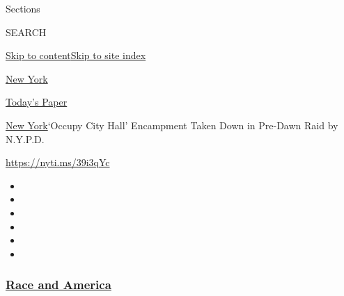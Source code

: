 Sections

SEARCH

\protect\hyperlink{site-content}{Skip to
content}\protect\hyperlink{site-index}{Skip to site index}

\href{https://www.nytimes3xbfgragh.onion/section/nyregion}{New York}

\href{https://myaccount.nytimes3xbfgragh.onion/auth/login?response_type=cookie\&client_id=vi}{}

\href{https://www.nytimes3xbfgragh.onion/section/todayspaper}{Today's
Paper}

\href{/section/nyregion}{New York}\textbar{}`Occupy City Hall'
Encampment Taken Down in Pre-Dawn Raid by N.Y.P.D.

\url{https://nyti.ms/39i3qYc}

\begin{itemize}
\item
\item
\item
\item
\item
\item
\end{itemize}

\hypertarget{race-and-america}{%
\subsubsection{\texorpdfstring{\href{https://www.nytimes3xbfgragh.onion/news-event/george-floyd-protests-minneapolis-new-york-los-angeles?name=styln-george-floyd\&region=TOP_BANNER\&variant=undefined\&block=storyline_menu_recirc\&action=click\&pgtype=Article\&impression_id=8dfd67f0-e38d-11ea-9429-99c7ddc8e385}{Race
and America}}{Race and America}}\label{race-and-america}}

